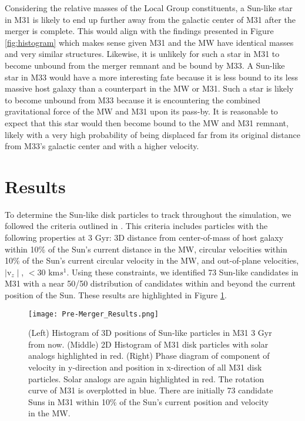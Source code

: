 \documentclass{aastex63}
\begin{document}
Considering the relative masses of the Local Group constituents, a Sun-like star in M31 is likely to end up further away from the galactic center of M31 after the merger is complete. This would align with the findings presented in Figure \ref{fig:histogram} which makes sense given M31 and the MW have identical masses and very similar structures. Likewise, it is unlikely for such a star in M31 to become unbound from the merger remnant and be bound by M33. A Sun-like star in M33 would have a more interesting fate because it is less bound to its less massive host galaxy than a counterpart in the MW or M31. Such a star is likely to become unbound from M33 because it is encountering the combined gravitational force of the MW and M31 upon its pass-by. It is reasonable to expect that this star would then become bound to the MW and M31 remnant, likely with a very high probability of being displaced far from its original distance from M33's galactic center and with a higher velocity.

\section{Results}
To determine the Sun-like disk particles to track throughout the simulation, we followed the criteria outlined in \cite{2012ApJ...753....8V}. This criteria includes particles with the following properties at 3 Gyr: 3D distance from center-of-mass of host galaxy within 10\% of the Sun's current distance in the MW, circular velocities within 10\% of the Sun's current circular velocity in the MW, and out-of-plane velocities, $\mid\textrm{v}_z\mid$, $<{30}$ $\textrm{km} s^{1}$. Using these constraints, we identified 73 Sun-like candidates in M31 with a near 50/50 distribution of candidates within and beyond the current position of the Sun. These results are highlighted in Figure \ref{fig:MyPlot1}.

\begin{figure}[h!]
    \centering
    \texttt{[image: Pre-Merger\_Results.png]}
    \caption{(Left) Histogram of 3D positions of Sun-like particles in M31 3 Gyr from now. (Middle) 2D Histogram of M31 disk particles with solar analogs highlighted in red. (Right) Phase diagram of component of velocity in y-direction and position in x-direction of all M31 disk particles. Solar analogs are again highlighted in red. The rotation curve of M31 is overplotted in blue. There are initially 73 candidate Suns in M31 within 10\% of the Sun's current position and velocity in the MW.}
    \label{fig:MyPlot1}
\end{figure}
\end{document}
